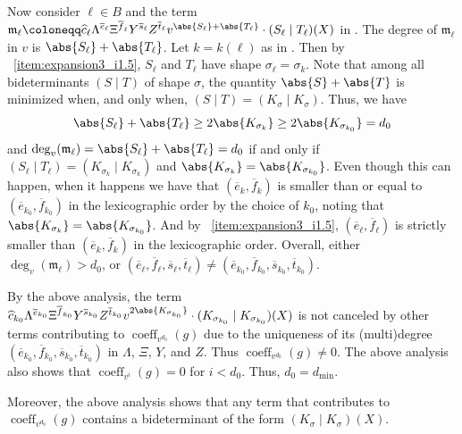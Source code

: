 \documentclass[10pt,a4paper]{amsart}
\DeclareMathOperator{\coeff}{coeff}
\newcommand*\defeq{\coloneqq}
\begin{document}
\begin{pf}
Now consider $\ell\in B$ and the term $\mathfrak{m}_\ell\defeq\widehat{c}_{\ell} \Lambda^{\overline{e}_\ell}\Xi^{\overline{f}_\ell}Y^{\overline{s}_\ell}Z^{\overline{t}_\ell}v^{\abs{S_\ell} + \abs{T_\ell}}\cdot (S_\ell\mid T_\ell)(X)$ in .
The degree of $\mathfrak{m}_\ell$ in $v$ is $\abs{S_\ell} + \abs{T_\ell}$.
Let $k=k(\ell)$ as in .
Then by ~\eqref{item:expansion3_i1.5}, $S_\ell$ and $T_\ell$ have shape $\sigma_\ell=\sigma_k$.
Note that among all bideterminants $(S\mid T)$ of shape $\sigma$, the quantity $\abs{S} + \abs{T}$ is minimized when, and only when, $(S\mid T)=(K_\sigma\mid K_\sigma)$.
Thus, we have 
\[
    \abs{S_\ell} + \abs{T_\ell} \geq 2 \abs{K_{\sigma_k}} \geq  2\abs{K_{\sigma_{k_0}}}=d_0
\]
and $\deg_v(\mathfrak{m}_\ell) = \abs{S_\ell} + \abs{T_\ell} = d_0$ if and only if $(S_\ell\mid T_\ell)=(K_{\sigma_k}\mid K_{\sigma_k})$ and $\abs{K_{\sigma_{k}}} = \abs{K_{\sigma_{k_0}}}$.
Even though this can happen, when it happens we have that $(\overline{e}_k,\overline{f}_k)$ is smaller than or equal to $(\overline{e}_{k_0},\overline{f}_{k_0})$ in the lexicographic order by the choice of $k_0$, noting that $\abs{K_{\sigma_{k}}} = \abs{K_{\sigma_{k_0}}}$.
And by ~\eqref{item:expansion3_i1.5}, $(\overline{e}_\ell, \overline{f}_\ell)$ is strictly smaller than $(\overline{e}_k,\overline{f}_k)$ in the lexicographic order.
Overall, either $\deg_v(\mathfrak{m}_\ell)>d_0$, or $(\overline{e}_\ell,\overline{f}_\ell,\overline{s}_\ell,\overline{t}_\ell)\neq (\overline{e}_{k_0},\overline{f}_{k_0},\overline{s}_{k_0},\overline{t}_{k_0})$.

By the above analysis, the term $\widehat{c}_{k_0} \Lambda^{\overline{e}_{k_0}}\Xi^{\overline{f}_{k_0}}Y^{\overline{s}_{k_0}}Z^{\overline{t}_{k_0}}v^{2 \abs{K_{\sigma_{k_0}}}}\cdot (K_{\sigma_{k_0}}\mid K_{\sigma_{k_0}})(X)$ is not canceled by other terms contributing to $\coeff_{v^{d_0}}(g)$ due to the uniqueness of its (multi)degree $(\overline{e}_{k_0},\overline{f}_{k_0},\overline{s}_{k_0},\overline{t}_{k_0})$ in $\Lambda$, $\Xi$, $Y$, and $Z$.
Thus $\coeff_{v^{d_0}}(g)\neq 0$.
The above analysis also shows that $\coeff_{v^{i}}(g)=0$ for $i<d_0$.
Thus, $d_0=d_{\min}$.

Moreover, the above analysis shows that any term that contributes to $\coeff_{v^{d_0}}(g)$ contains a bideterminant of the form $(K_\sigma \mid K_\sigma)(X)$.


\end{pf}
\end{document}

